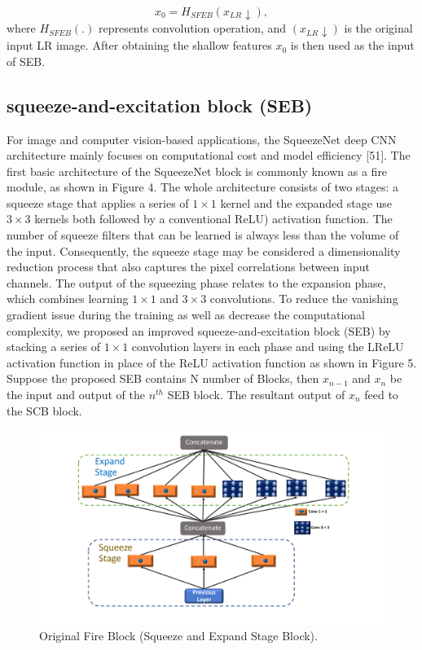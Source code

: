 \documentclass{ieeeaccess}
\begin{document}
\begin{equation}
{x_{0}}= {H_{SFEB}}({x_{LR}}\downarrow),
\end{equation}
where ${H_{SFEB}}$$(.)$ represents convolution operation, and $({x_{LR}}\downarrow)$ is the original input LR image. After obtaining the shallow features ${x_{0}}$ is then used as the input of SEB.
\subsection{ squeeze-and-excitation block (SEB)}
For image and computer vision-based applications, the SqueezeNet deep CNN architecture mainly focuses on computational cost and model efficiency [51]. The first basic architecture of the SqueezeNet block is commonly known as a fire module, as shown in Figure 4. The whole architecture consists of two stages: a squeeze stage that applies a series of $1\times1$ kernel and the expanded stage use $3\times3$ kernels both followed by a conventional ReLU) activation function. The number of squeeze filters that can be learned is always less than the volume of the input. Consequently, the squeeze stage may be considered a dimensionality reduction process that also captures the pixel correlations between input channels. The output of the squeezing phase relates to the expansion phase, which combines learning $1\times1$ and $3\times3$ convolutions. To reduce the vanishing gradient issue during the training as well as decrease the computational complexity, we proposed an improved squeeze-and-excitation block (SEB) by stacking a series of $1\times1$ convolution layers in each phase and using the LReLU activation function in place of the ReLU activation function as shown in Figure 5. Suppose the proposed SEB contains N number of Blocks, then $x_{n-1}$ and $x_n$ be the input and output of the $n^{th}$ SEB block. The resultant output of $x_n$ feed to the SCB block.

\begin{figure}
    \centering

    \includegraphics[width=\linewidth]{4Figure.pdf}
    \caption{Original Fire Block (Squeeze and Expand Stage Block).}
    \label{fig:4}
\end{figure}
\end{document}
